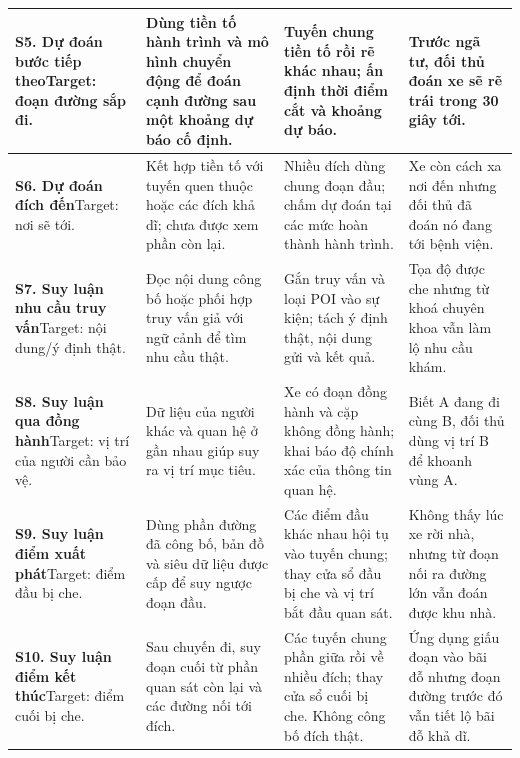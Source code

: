 \documentclass[12pt,a4paper,oneside]{report}
\begin{document}
\begin{longtable}{P{2.9cm}P{3.5cm}P{4.0cm}P{3.7cm}}
\midrule
\textbf{S5. Dự đoán bước tiếp theo}\newline Target: đoạn đường sắp đi.
& Dùng tiền tố hành trình và mô hình chuyển động để đoán cạnh đường sau một khoảng dự báo cố định.~\citep{ziebart2008maxent}
& Tuyến chung tiền tố rồi rẽ khác nhau; ấn định thời điểm cắt và khoảng dự báo.
& Trước ngã tư, đối thủ đoán xe sẽ rẽ trái trong 30 giây tới.\\
\midrule
\textbf{S6. Dự đoán đích đến}\newline Target: nơi sẽ tới.
& Kết hợp tiền tố với tuyến quen thuộc hoặc các đích khả dĩ; chưa được xem phần còn lại.~\citep{ziebart2008maxent}
& Nhiều đích dùng chung đoạn đầu; chấm dự đoán tại các mức hoàn thành hành trình.
& Xe còn cách xa nơi đến nhưng đối thủ đã đoán nó đang tới bệnh viện.\\
\midrule
\textbf{S7. Suy luận nhu cầu truy vấn}\newline Target: nội dung/ý định thật.
& Đọc nội dung công bố hoặc phối hợp truy vấn giả với ngữ cảnh để tìm nhu cầu thật.~\citep{wu2021fakequery}
& Gắn truy vấn và loại POI vào sự kiện; tách ý định thật, nội dung gửi và kết quả.
& Tọa độ được che nhưng từ khoá chuyên khoa vẫn làm lộ nhu cầu khám.\\
\midrule
\textbf{S8. Suy luận qua đồng hành}\newline Target: vị trí của người cần bảo vệ.
& Dữ liệu của người khác và quan hệ ở gần nhau giúp suy ra vị trí mục tiêu.~\citep{olteanu2017interdependent}
& Xe có đoạn đồng hành và cặp không đồng hành; khai báo độ chính xác của thông tin quan hệ.
& Biết A đang đi cùng B, đối thủ dùng vị trí B để khoanh vùng A.\\
\midrule
\textbf{S9. Suy luận điểm xuất phát}\newline Target: điểm đầu bị che.
& Dùng phần đường đã công bố, bản đồ và siêu dữ liệu được cấp để suy ngược đoạn đầu.~\citep{dhondt2022endpoint}
& Các điểm đầu khác nhau hội tụ vào tuyến chung; thay cửa sổ đầu bị che và vị trí bắt đầu quan sát.
& Không thấy lúc xe rời nhà, nhưng từ đoạn nối ra đường lớn vẫn đoán được khu nhà.\\
\midrule
\textbf{S10. Suy luận điểm kết thúc}\newline Target: điểm cuối bị che.
& Sau chuyến đi, suy đoạn cuối từ phần quan sát còn lại và các đường nối tới đích.~\citep{dhondt2022endpoint}
& Các tuyến chung phần giữa rồi về nhiều đích; thay cửa sổ cuối bị che. Không công bố đích thật.
& Ứng dụng giấu đoạn vào bãi đỗ nhưng đoạn đường trước đó vẫn tiết lộ bãi đỗ khả dĩ.\\
\end{longtable}
\endgroup
\end{document}
